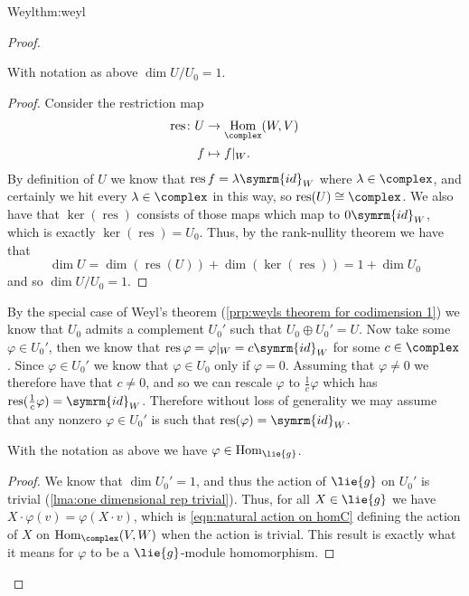 \documentclass[fleqn]{NotesClass}
\DeclareMathOperator{\Hom}{Hom}
\newcommand{\isomorphic}{\cong}
\newcommand{\id}{\symrm{id}}
\DeclareMathOperator{\res}{res}
\begin{document}
\begin{thm}{Weyl}{thm:weyl}
\begin{proof}
            \begin{clm}{}{}
                With notation as above \(\dim U/U_0 = 1\).
                \begin{proof}
                    Consider the restriction map
                    \begin{align}
                        \res \colon U &\to \Hom_{\complex}(W, V)\\
                        f &\mapsto f|_W.
                    \end{align}
                    By definition of \(U\) we know that \(\res f = \lambda \id_W\) where \(\lambda \in \complex\), and certainly we hit every \(\lambda \in \complex\) in this way, so \(\res(U) \isomorphic \complex\).
                    We also have that \(\ker(\res)\) consists of those maps which map to \(0 \id_W\), which is exactly \(\ker(\res) = U_0\).
                    Thus, by the rank-nullity theorem we have that
                    \begin{equation}
                        \dim U = \dim(\res(U)) + \dim(\ker(\res)) = 1 + \dim U_0
                    \end{equation}
                    and so \(\dim U/U_0 = 1\).
                \end{proof}
            \end{clm}
            
            By the special case of Weyl's theorem (\cref{prp:weyls theorem for codimension 1}) we know that \(U_0\) admits a complement \(U_0'\) such that \(U_0 \oplus U_0' = U\).
            Now take some \(\varphi \in U_0'\), then we know that \(\res \varphi = \varphi|_W = c \id_W\) for some \(c \in \complex\).
            Since \(\varphi \in U_0'\) we know that \(\varphi \in U_0\) only if \(\varphi = 0\).
            Assuming that \(\varphi \ne 0\) we therefore have that \(c \ne 0\), and so we can rescale \(\varphi\) to \(\frac{1}{c}\varphi\) which has \(\res(\frac{1}{c}\varphi) = \id_W\).
            Therefore without loss of generality we may assume that any nonzero \(\varphi \in U_0'\) is such that \(\res(\varphi) = \id_W\).
            
            \begin{clm}{}{}
                With the notation as above we have \(\varphi \in \Hom_{\lie{g}}\).
                \begin{proof}
                    We know that \(\dim U_0' = 1\), and thus the action of \(\lie{g}\) on \(U_0'\) is trivial (\cref{lma:one dimensional rep trivial}).
                    Thus, for all \(X \in \lie{g}\) we have \(X \cdot \varphi(v) = \varphi(X \cdot v)\), which is \cref{eqn:natural action on homC} defining the action of \(X\) on \(\Hom_{\complex}(V, W)\) when the action is trivial.
                    This result is exactly what it means for \(\varphi\) to be a \(\lie{g}\)-module homomorphism.
                \end{proof}
            \end{clm}
            

\end{proof}
\end{thm}
\end{document}
